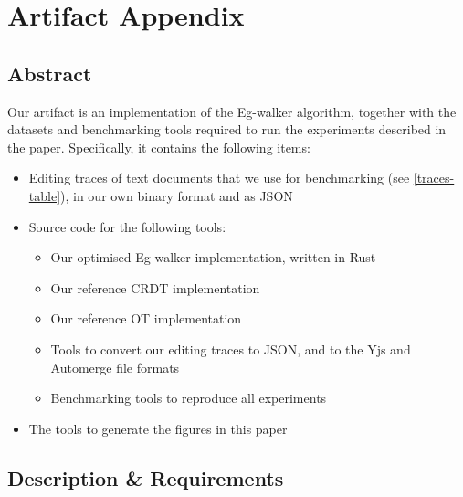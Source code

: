 \documentclass[sigplan,10pt]{acmart}
\begin{document}
\clearpage
\appendix
\section{Artifact Appendix} 
\subsection{Abstract}

Our artifact is an implementation of the Eg-walker algorithm, together with the datasets and benchmarking tools required to run the experiments described in the paper.
Specifically, it contains the following items:
\begin{itemize}
    \item Editing traces of text documents that we use for benchmarking (see \autoref{traces-table}), in our own binary format and as JSON
    \item Source code for the following tools:
        \begin{itemize}
            \item Our optimised Eg-walker implementation, written in Rust
            \item Our reference CRDT implementation
            \item Our reference OT implementation
            \item Tools to convert our editing traces to JSON, and to the Yjs and Automerge file formats
            \item Benchmarking tools to reproduce all experiments
        \end{itemize}
    \item The tools to generate the figures in this paper
\end{itemize}

\subsection{Description \& Requirements}

\end{document}
